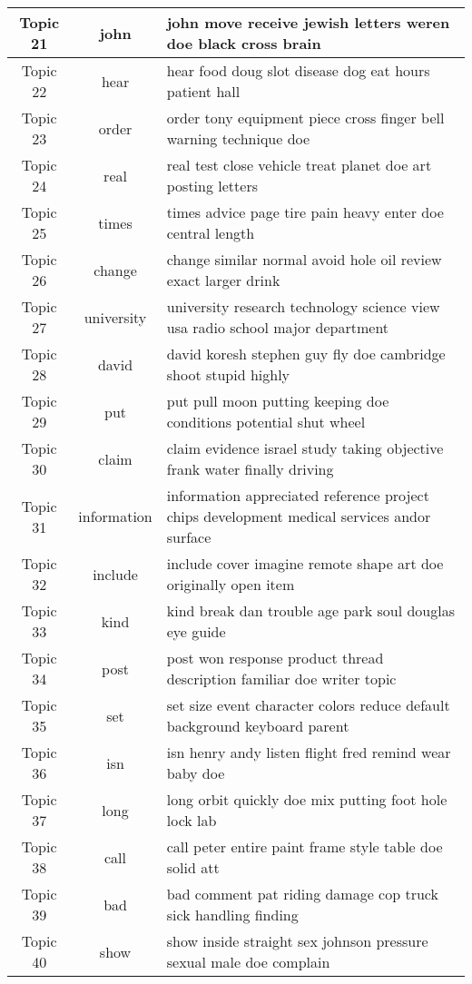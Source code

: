 \documentclass{article}
\begin{document}
\begin{table}[h]
\begin{center}
\begin{tabular}{|c|c|l|}
Topic	21	&	john & john move receive jewish letters weren doe black cross brain	\\ \hline
Topic	22	&	hear & hear food doug slot disease dog eat hours patient hall	\\ \hline
Topic	23	&	order & order tony equipment piece cross finger bell warning technique doe	\\ \hline
Topic	24	&	real & real test close vehicle treat planet doe art posting letters	\\ \hline
Topic	25	&	times & times advice page tire pain heavy enter doe central length	\\ \hline
Topic	26	&	change & change similar normal avoid hole oil review exact larger drink	\\ \hline
Topic	27	&	university & university research technology science view usa radio school major department	\\ \hline
Topic	28	&	david & david koresh stephen guy fly doe cambridge shoot stupid highly	\\ \hline
Topic	29	&	put & put pull moon putting keeping doe conditions potential shut wheel	\\ \hline
Topic	30	&	claim & claim evidence israel study taking objective frank water finally driving	\\ \hline
Topic	31	&	information & information appreciated reference project chips development medical services andor surface	\\ \hline
Topic	32	&	include & include cover imagine remote shape art doe originally open item	\\ \hline
Topic	33	&	kind & kind break dan trouble age park soul douglas eye guide	\\ \hline
Topic	34	&	post & post won response product thread description familiar doe writer topic	\\ \hline
Topic	35	&	set & set size event character colors reduce default background keyboard parent	\\ \hline
Topic	36	&	isn & isn henry andy listen flight fred remind wear baby doe	\\ \hline
Topic	37	&	long & long orbit quickly doe mix putting foot hole lock lab	\\ \hline
Topic	38	&	call & call peter entire paint frame style table doe solid att	\\ \hline
Topic	39	&	bad & bad comment pat riding damage cop truck sick handling finding	\\ \hline
Topic	40	&	show & show inside straight sex johnson pressure sexual male doe complain	\\ \hline




          \end{tabular}

       \label{tab:M700_0_1 topics}
   \end{center}
\vspace{-10pt}
\end{table}
\end{document}
